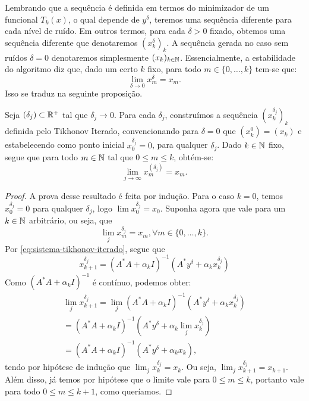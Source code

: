 Lembrando que a sequência é definida em termos do minimizador de um funcional $T_k(x)$, o qual depende de $y^\delta$, teremos uma sequência diferente para cada nível de ruído. Em outros termos, para cada $\delta>0$ fixado, obtemos uma sequência diferente que denotaremos $(x_k^\delta)_k$. A sequência gerada no caso sem ruídos $\delta=0$ denotaremos simplesmente $(x_k)_{k\in \mathbb N}$. Essencialmente, a estabilidade do algoritmo diz que, dado um certo $k$ fixo, para todo $m \in \{0, \dots, k\}$ tem-se que:
\[
\lim_{\delta \to 0} x_m^\delta = x_m.
\]
Isso se traduz na seguinte proposição.
\begin{prop}
    Seja $(\delta_j)\subset \mathbb{R}^+$ tal que $\delta_j \to 0$. Para cada $\delta_j$, construímos a sequência $(x_k^{\delta_j})_k$ definida pelo Tikhonov Iterado, convencionando para $\delta=0$ que $(x_k^{0})=(x_k)$ e estabelecendo como ponto inicial $x_0^{\delta_j} = 0$, para qualquer $\delta_j$. Dado $k\in \mathbb N$ fixo, segue que para todo $m\in \mathbb N$ tal que $0\leq m \leq k$, obtém-se:
    \[
    \lim_{j \to \infty} x_m^{(\delta_j)} = x_m.
    \]
\end{prop}
\begin{proof}
    A prova desse resultado é feita por indução. Para o caso $k = 0$, temos $x_0^{\delta_j} = 0$ para qualquer $\delta_j$, logo $\lim x_0^{\delta_j} = x_0$. Suponha agora que vale para um $k\in \mathbb N$ arbitrário, ou seja, que
    \[
    \lim_j x_m^{\delta_j} = x_m, \forall m \in \{0,\dots, k\}.
    \]
    Por \eqref{eq:sistema-tikhonov-iterado}, segue que
    \[
    x_{k+1}^{\delta_j} = (A^* A + \alpha_k I)^{-1}( A^* y^\delta + \alpha_k x_k^{\delta_j})
    \]
    Como $(A^* A + \alpha_k I)^{-1}$ é contínuo, podemos obter:
    \begin{align*}
    \lim_j x_{k+1}^{\delta_j} = \lim_j(A^* A + \alpha_k I)^{-1}( A^* y^\delta + \alpha_k x_k^{\delta_j})\\
    =(A^* A + \alpha_k I)^{-1}( A^* y^\delta + \alpha_k \lim_jx_k^{\delta_j})\\
    = (A^* A + \alpha_k I)^{-1}( A^* y^\delta + \alpha_k x_k),
    \end{align*}
    tendo por hipótese de indução que $\lim_jx_k^{\delta_j}=x_k$. Ou seja, $\lim_j x_{k+1}^{\delta_j} = x_{k+1}$. Além disso, já temos por hipótese que o limite vale para $0\leq m \leq k$, portanto vale para todo $0 \leq m \leq k+1$, como queríamos.
\end{proof}

